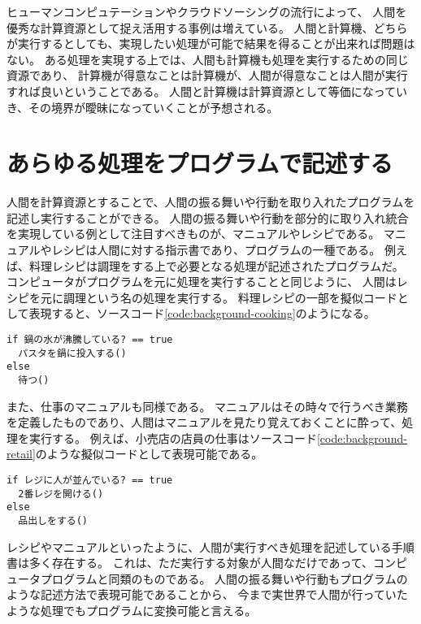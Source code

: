 ヒューマンコンピュテーションやクラウドソーシングの流行によって、
人間を優秀な計算資源として捉え活用する事例は増えている。
人間と計算機、どちらが実行するとしても、実現したい処理が可能で結果を得ることが出来れば問題はない。
ある処理を実現する上では、人間も計算機も処理を実行するための同じ資源であり、
計算機が得意なことは計算機が、人間が得意なことは人間が実行すれば良いということである。
人間と計算機は計算資源として等価になっていき、その境界が曖昧になっていくことが予想される。

\section{あらゆる処理をプログラムで記述する}\label{ux3042ux3089ux3086ux308bux51e6ux7406ux3092ux30d7ux30edux30b0ux30e9ux30e0ux3067ux8a18ux8ff0ux3059ux308b}

人間を計算資源とすることで、人間の振る舞いや行動を取り入れたプログラムを記述し実行することができる。
人間の振る舞いや行動を部分的に取り入れ統合を実現している例として注目すべきものが、マニュアルやレシピである。
マニュアルやレシピは人間に対する指示書であり、プログラムの一種である。
例えば、料理レシピは調理をする上で必要となる処理が記述されたプログラムだ。
コンピュータがプログラムを元に処理を実行することと同じように、
人間はレシピを元に調理という名の処理を実行する。
料理レシピの一部を擬似コードとして表現すると、ソースコード\ref{code:background-cooking}のようになる。

\begin{lstlisting}[caption=料理レシピの一部の擬似コードで表す, label=code:background-cooking]
if 鍋の水が沸騰している? == true
  パスタを鍋に投入する()
else
  待つ()
\end{lstlisting}

また、仕事のマニュアルも同様である。
マニュアルはその時々で行うべき業務を定義したものであり、人間はマニュアルを見たり覚えておくことに酔って、処理を実行する。
例えば、小売店の店員の仕事はソースコード\ref{code:background-retail}のような擬似コードとして表現可能である。

\begin{lstlisting}[caption=小売店の店員の挙動の一部を擬似コードで表す, label=code:background-retail]
if レジに人が並んでいる? == true
  2番レジを開ける()
else
  品出しをする()
\end{lstlisting}

レシピやマニュアルといったように、人間が実行すべき処理を記述している手順書は多く存在する。
これは、ただ実行する対象が人間なだけであって、コンピュータプログラムと同類のものである。
人間の振る舞いや行動もプログラムのような記述方法で表現可能であることから、
今まで実世界で人間が行っていたような処理でもプログラムに変換可能と言える。

